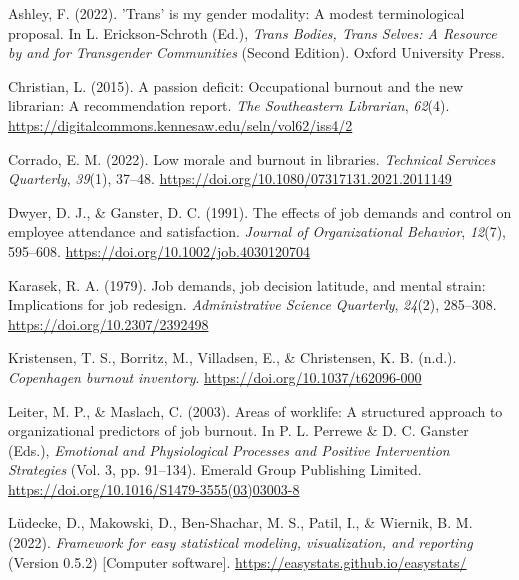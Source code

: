 \documentclass[
  twocolumn]{article}
\newlength{\cslhangindent}
\newenvironment{CSLReferences}[2] %
 {\begin{list}{}{%
  \setlength{\itemindent}{0pt}
  \setlength{\leftmargin}{0pt}
  \setlength{\parsep}{0pt}
  \ifodd #1
   \setlength{\leftmargin}{\cslhangindent}
   \setlength{\itemindent}{-1\cslhangindent}
  \fi
  \setlength{\itemsep}{#2\baselineskip}}}
 {\end{list}}
\begin{document}
\protect{}\label{refs}
\begin{CSLReferences}{1}{0}
Ashley, F. (2022). 'Trans' is my gender modality: A modest
terminological proposal. In L. Erickson-Schroth (Ed.), \emph{Trans
{Bodies}, {Trans Selves}: {A Resource} by and for {Transgender
Communities}} (Second Edition). Oxford University Press.

Christian, L. (2015). A passion deficit: Occupational burnout and the
new librarian: A recommendation report. \emph{The Southeastern
Librarian}, \emph{62}(4).
\url{https://digitalcommons.kennesaw.edu/seln/vol62/iss4/2}

Corrado, E. M. (2022). Low morale and burnout in libraries.
\emph{Technical Services Quarterly}, \emph{39}(1), 37--48.
\url{https://doi.org/10.1080/07317131.2021.2011149}

Dwyer, D. J., \& Ganster, D. C. (1991). The effects of job demands and
control on employee attendance and satisfaction. \emph{Journal of
Organizational Behavior}, \emph{12}(7), 595--608.
\url{https://doi.org/10.1002/job.4030120704}

Karasek, R. A. (1979). Job demands, job decision latitude, and mental
strain: Implications for job redesign. \emph{Administrative Science
Quarterly}, \emph{24}(2), 285--308.
\url{https://doi.org/10.2307/2392498}

Kristensen, T. S., Borritz, M., Villadsen, E., \& Christensen, K. B.
(n.d.). \emph{Copenhagen burnout inventory}.
\url{https://doi.org/10.1037/t62096-000}

Leiter, M. P., \& Maslach, C. (2003). Areas of worklife: A structured
approach to organizational predictors of job burnout. In P. L. Perrewe
\& D. C. Ganster (Eds.), \emph{Emotional and {Physiological Processes}
and {Positive Intervention Strategies}} (Vol. 3, pp. 91--134). Emerald
Group Publishing Limited.
\url{https://doi.org/10.1016/S1479-3555(03)03003-8}

Lüdecke, D., Makowski, D., Ben-Shachar, M. S., Patil, I., \& Wiernik, B.
M. (2022). \emph{Framework for easy statistical modeling, visualization,
and reporting} (Version 0.5.2) {[}Computer software{]}.
\url{https://easystats.github.io/easystats/}


\end{CSLReferences}
\end{document}
